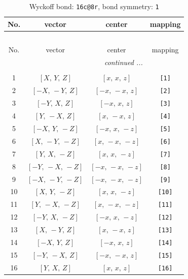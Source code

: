 \documentclass[fleqn,8pt]{jsarticle}
\begin{document}
\begin{longtable}{cccc}
\caption{Wyckoff bond: {\tt 16c@8r}, bond symmetry: {\tt 1}}
 \\
 \hline \hline
No. & vector & center & mapping \\ \hline \endfirsthead

\multicolumn{3}{l}{\tablename\ \thetable{}} \\
 \hline \hline
No. & vector & center & mapping \\ \hline \endhead

 \hline \hline
\multicolumn{3}{r}{\footnotesize\it continued ...} \\ \endfoot

 \hline \hline
\multicolumn{3}{r}{} \\ \endlastfoot

1 & $\left[ X,\, Y,\, Z \right]$ & $\left[ x,\, x,\, z \right]$ & {\tt [1]} \\ \hline
2 & $\left[ - X,\, - Y,\, Z \right]$ & $\left[ - x,\, - x,\, z \right]$ & {\tt [2]} \\ \hline
3 & $\left[ - Y,\, X,\, Z \right]$ & $\left[ - x,\, x,\, z \right]$ & {\tt [3]} \\ \hline
4 & $\left[ Y,\, - X,\, Z \right]$ & $\left[ x,\, - x,\, z \right]$ & {\tt [4]} \\ \hline
5 & $\left[ - X,\, Y,\, - Z \right]$ & $\left[ - x,\, x,\, - z \right]$ & {\tt [5]} \\ \hline
6 & $\left[ X,\, - Y,\, - Z \right]$ & $\left[ x,\, - x,\, - z \right]$ & {\tt [6]} \\ \hline
7 & $\left[ Y,\, X,\, - Z \right]$ & $\left[ x,\, x,\, - z \right]$ & {\tt [7]} \\ \hline
8 & $\left[ - Y,\, - X,\, - Z \right]$ & $\left[ - x,\, - x,\, - z \right]$ & {\tt [8]} \\ \hline
9 & $\left[ - X,\, - Y,\, - Z \right]$ & $\left[ - x,\, - x,\, - z \right]$ & {\tt [9]} \\ \hline
10 & $\left[ X,\, Y,\, - Z \right]$ & $\left[ x,\, x,\, - z \right]$ & {\tt [10]} \\ \hline
11 & $\left[ Y,\, - X,\, - Z \right]$ & $\left[ x,\, - x,\, - z \right]$ & {\tt [11]} \\ \hline
12 & $\left[ - Y,\, X,\, - Z \right]$ & $\left[ - x,\, x,\, - z \right]$ & {\tt [12]} \\ \hline
13 & $\left[ X,\, - Y,\, Z \right]$ & $\left[ x,\, - x,\, z \right]$ & {\tt [13]} \\ \hline
14 & $\left[ - X,\, Y,\, Z \right]$ & $\left[ - x,\, x,\, z \right]$ & {\tt [14]} \\ \hline
15 & $\left[ - Y,\, - X,\, Z \right]$ & $\left[ - x,\, - x,\, z \right]$ & {\tt [15]} \\ \hline
16 & $\left[ Y,\, X,\, Z \right]$ & $\left[ x,\, x,\, z \right]$ & {\tt [16]} \\
\end{longtable}
\end{document}

